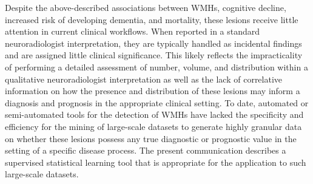 \documentclass[11pt,]{article}
\begin{document}
Despite the above-described associations between WMHs, cognitive
decline, increased risk of developing dementia, and mortality, these
lesions receive little attention in current clinical workflows. When
reported in a standard neuroradiologist interpretation, they are
typically handled as incidental findings and are assigned little
clinical significance. This likely reflects the impracticality of
performing a detailed assessment of number, volume, and distribution
within a qualitative neuroradiologist interpretation as well as the lack
of correlative information on how the presence and distribution of these
lesions may inform a diagnosis and prognosis in the appropriate clinical
setting. To date, automated or semi-automated tools for the detection of
WMHs have lacked the specificity and efficiency for the mining of
large-scale datasets to generate highly granular data on whether these
lesions possess any true diagnostic or prognostic value in the setting
of a specific disease process. The present communication describes a
supervised statistical learning tool that is appropriate for the
application to such large-scale datasets.
\end{document}
